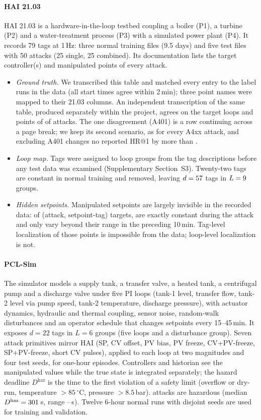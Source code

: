 \paragraph{HAI 21.03} HAI 21.03 \citep{shin2021hai} is a hardware-in-the-loop testbed coupling a boiler (P1), a turbine (P2) and a water-treatment process (P3) with a simulated power plant (P4). It records 79 tags at 1\,Hz: three normal training files (9.5 days) and five test files with 50 attacks (25 single, 25 combined). Its documentation lists the target controller(s) and manipulated points of every attack.
\begin{itemize}
\item \emph{Ground truth.} We transcribed this table and matched every entry to the label runs in the data (all start times agree within 2\,min); three point names were mapped to their 21.03 columns. An independent transcription of the same table, produced separately within the project, agrees on the target loops and points of \gtcrossAgree{} of \gtcrossN{} attacks. The one disagreement (A401) is a row continuing across a page break; we keep its second scenario, as for every A4xx attack, and excluding A401 changes no reported HR@1 by more than \aFourZeroOneMaxDiff.
\item \emph{Loop map.} Tags were assigned to loop groups from the tag descriptions before any test data was examined (Supplementary Section~S3). Twenty-two tags are constant in normal training and removed, leaving $d=57$ tags in $L=9$ groups.
\item \emph{Hidden setpoints.} Manipulated setpoints are largely invisible in the recorded data: of \spN{} (attack, setpoint-tag) targets, \spConstant{} are exactly constant during the attack and only \spVisible{} vary beyond their range in the preceding 10\,min. Tag-level localization of those points is impossible from the data; loop-level localization is not.
\end{itemize}

\paragraph{PCL-Sim} The simulator models a supply tank, a transfer valve, a heated tank, a centrifugal pump and a discharge valve under five PI loops (tank-1 level, transfer flow, tank-2 level via pump speed, tank-2 temperature, discharge pressure), with actuator dynamics, hydraulic and thermal coupling, sensor noise, random-walk disturbances and an operator schedule that changes setpoints every 15--45\,min. It exposes $d=22$ tags in $L=6$ groups (five loops and a disturbance group). Seven attack primitives mirror HAI (SP, CV offset, PV bias, PV freeze, CV+PV-freeze, SP+PV-freeze, short CV pulses), applied to each loop at two magnitudes and four test seeds, for \SimNattacks{} one-hour episodes. Controllers and historian see the manipulated values while the true state is integrated separately; the hazard deadline $D^{\mathrm{haz}}$ is the time to the first violation of a safety limit (overflow or dry-run, temperature $>85\,^\circ$C, pressure $>8.5$\,bar). \SimNhaz{} attacks are hazardous (median $D^{\mathrm{haz}}=301$\,s, range \SimHazMin--\SimHazMax\,s). Twelve 6-hour normal runs with disjoint seeds are used for training and validation.

